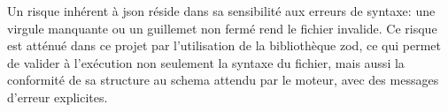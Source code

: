 Un risque inhérent à \gls{json} réside dans sa sensibilité aux erreurs de \gls{syntaxe}: une virgule manquante ou un guillemet non fermé rend le fichier invalide. Ce risque est atténué dans ce projet par l'utilisation de la bibliothèque \gls{zod}, ce qui permet de valider à l'exécution non seulement la \gls{syntaxe} du fichier, mais aussi la conformité de sa structure au \gls{schema} attendu par le moteur, avec des messages d'erreur explicites.